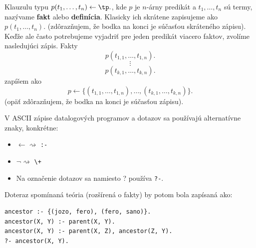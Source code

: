 \begin{definition}
Klauzulu typu $p(t_1, \dots, t_n) \leftarrow \tp.$, kde $p$ je $n$-árny predikát a $t_1, \dots, t_n$
sú termy, nazývame \textbf{fakt} alebo \textbf{definícia}. Klasicky ich skrátene zapisujeme ako $p(t_1, \dots, t_n).$
(zdôrazňujem, že bodka na konci je súčasťou skráteného zápisu). Keďže ale často potrebujeme vyjadriť
pre jeden predikát viacero faktov, zvolíme nasledujúci zápis. Fakty 
$$p(t_{1, 1}, \dots, t_{1, n}).$$
$$\vdots$$
$$p(t_{k, 1}, \dots, t_{k, n}).$$ zapíšem ako
$$p \leftarrow \{(t_{1, 1}, \dots, t_{1, n}), \dots, (t_{k, 1}, \dots, t_{k, n})\}.$$ (opäť zdôrazňujem, že
bodka na konci je súčasťou zápisu).
\end{definition}

V ASCII zápise datalogových programov a dotazov sa používajú alternatívne znaky, konkrétne:
\begin{itemize}
\item $\leftarrow \rightsquigarrow$ \texttt{:-}
\item $\lnot \rightsquigarrow$ \texttt{\textbackslash+}
\item Na označenie dotazov sa namiesto ? používa \texttt{?-}.
\end{itemize}

Doteraz spomínaná teória (rozšírená o fakty) by potom bola zapísaná ako:
\begin{priklad}
\begin{verbatim}
ancestor :- {(jozo, fero), (fero, sano)}.
ancestor(X, Y) :- parent(X, Y).
ancestor(X, Y) :- parent(X, Z), ancestor(Z, Y).
?- ancestor(X, Y).
\end{verbatim}
\end{priklad}